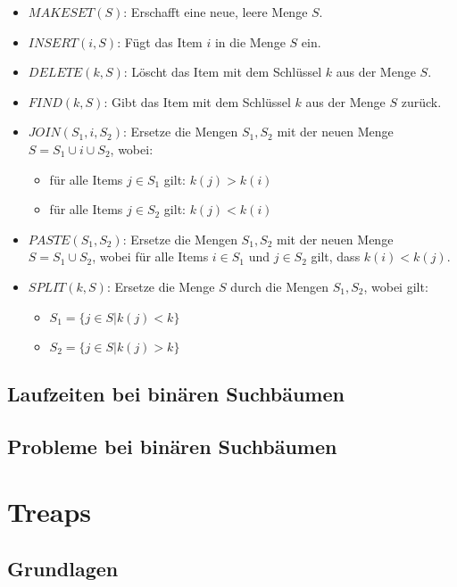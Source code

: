 \documentclass[a4paper]{scrreprt}
\theoremstyle{definition}
\begin{document}
\begin{itemize}
\item $MAKESET(S)$: Erschafft eine neue, leere Menge $S$.
\item $INSERT(i, S)$: Fügt das Item $i$ in die Menge $S$ ein.
\item $DELETE(k, S)$: Löscht das Item mit dem Schlüssel $k$ aus der Menge $S$.
\item $FIND(k, S)$: Gibt das Item mit dem Schlüssel $k$ aus der Menge $S$ zurück.
\item $JOIN(S_1, i, S_2)$: Ersetze die Mengen $S_1, S_2$ mit der neuen Menge $S = S_1 \cup {i} \cup S_2$, wobei:
	\begin{itemize}
	\item für alle Items $j \in S_1$ gilt: $k(j) > k(i)$
	\item für alle Items $j \in S_2$ gilt: $k(j) < k(i)$
	\end{itemize} 
\item $PASTE(S_1, S_2)$: Ersetze die Mengen $S_1, S_2$ mit der neuen Menge $S = S_1 \cup S_2$, wobei für alle Items $i \in S_1$ und $j \in S_2$ gilt, dass $k(i) < k(j)$.
\item $SPLIT (k, S)$: Ersetze die Menge $S$ durch die Mengen $S_1, S_2$, wobei gilt:
	\begin{itemize}
	\item $S_1 = \{j \in S | k(j) < k\}$
	\item $S_2 = \{j \in S | k(j) > k\}$
	\end{itemize}
\end{itemize}

\section{Laufzeiten bei binären Suchbäumen}
\label{sec:binaryruntime}

\section{Probleme bei binären Suchbäumen}
\label{sec:binaryproblems}

\chapter{Treaps}
\label{sec:treaps}

\section{Grundlagen}
\label{sec:treapsbasics}
\end{document}
